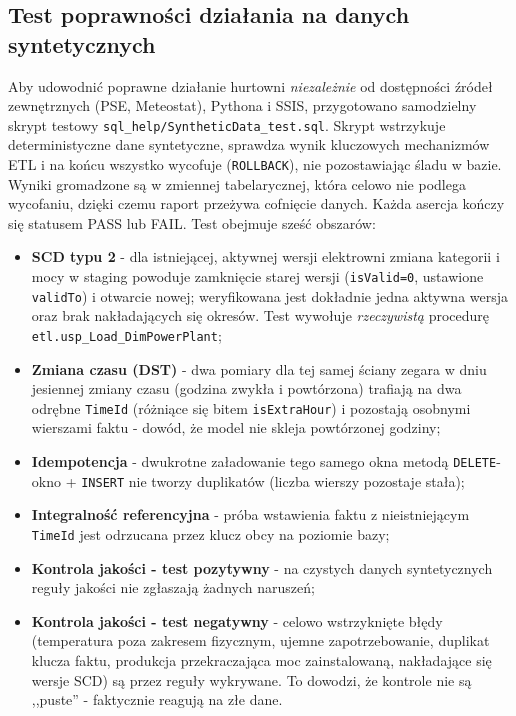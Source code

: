 \documentclass[12pt]{article}
\begin{document}
	\subsection{Test poprawności działania na danych syntetycznych}
	\label{sec:synttest}

	Aby udowodnić poprawne działanie hurtowni \emph{niezależnie} od dostępności źródeł zewnętrznych (PSE, Meteostat), Pythona i SSIS, przygotowano samodzielny skrypt testowy \texttt{sql\_help/SyntheticData\_test.sql}. Skrypt wstrzykuje deterministyczne dane syntetyczne, sprawdza wynik kluczowych mechanizmów ETL i na końcu wszystko wycofuje (\texttt{ROLLBACK}), nie pozostawiając śladu w bazie. Wyniki gromadzone są w zmiennej tabelarycznej, która celowo nie podlega wycofaniu, dzięki czemu raport przeżywa cofnięcie danych. Każda asercja kończy się statusem PASS lub FAIL. Test obejmuje sześć obszarów:

	\begin{itemize}
		\item \textbf{SCD typu 2} - dla istniejącej, aktywnej wersji elektrowni zmiana kategorii i mocy w staging powoduje zamknięcie starej wersji (\texttt{isValid=0}, ustawione \texttt{validTo}) i otwarcie nowej; weryfikowana jest dokładnie jedna aktywna wersja oraz brak nakładających się okresów. Test wywołuje \emph{rzeczywistą} procedurę \texttt{etl.usp\_Load\_DimPowerPlant};
		\item \textbf{Zmiana czasu (DST)} - dwa pomiary dla tej samej ściany zegara w dniu jesiennej zmiany czasu (godzina zwykła i powtórzona) trafiają na dwa odrębne \texttt{TimeId} (różniące się bitem \texttt{isExtraHour}) i pozostają osobnymi wierszami faktu - dowód, że model nie skleja powtórzonej godziny;
		\item \textbf{Idempotencja} - dwukrotne załadowanie tego samego okna metodą \texttt{DELETE}-okno + \texttt{INSERT} nie tworzy duplikatów (liczba wierszy pozostaje stała);
		\item \textbf{Integralność referencyjna} - próba wstawienia faktu z nieistniejącym \texttt{TimeId} jest odrzucana przez klucz obcy na poziomie bazy;
		\item \textbf{Kontrola jakości - test pozytywny} - na czystych danych syntetycznych reguły jakości nie zgłaszają żadnych naruszeń;
		\item \textbf{Kontrola jakości - test negatywny} - celowo wstrzyknięte błędy (temperatura poza zakresem fizycznym, ujemne zapotrzebowanie, duplikat klucza faktu, produkcja przekraczająca moc zainstalowaną, nakładające się wersje SCD) są przez reguły wykrywane. To dowodzi, że kontrole nie są ,,puste'' - faktycznie reagują na złe dane.
	\end{itemize}
\end{document}
